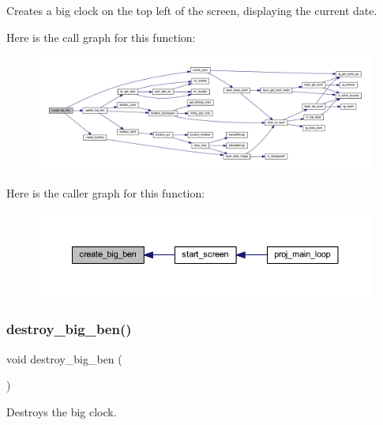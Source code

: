 Creates a big clock on the top left of the screen, displaying the current date. 

Here is the call graph for this function\+:
\nopagebreak
\begin{figure}[H]
\begin{center}
\leavevmode
\includegraphics[width=350pt]{group__clock_ga59029f76a2cbf7aad54d01f50cf80cf9_cgraph}
\end{center}
\end{figure}
Here is the caller graph for this function\+:\nopagebreak
\begin{figure}[H]
\begin{center}
\leavevmode
\includegraphics[width=350pt]{group__clock_ga59029f76a2cbf7aad54d01f50cf80cf9_icgraph}
\end{center}
\end{figure}
\mbox{\label{group__clock_ga74cbf0ece67234028fdd0465d51bfc0d}} 
\subsubsection{\texorpdfstring{destroy\+\_\+big\+\_\+ben()}{destroy\_big\_ben()}}
{\footnotesize\ttfamily void destroy\+\_\+big\+\_\+ben (\begin{DoxyParamCaption}{ }\end{DoxyParamCaption})}



Destroys the big clock. 

